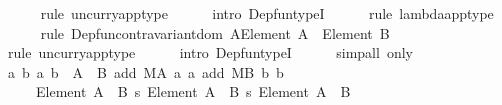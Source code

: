 \begin{isabellebody}
\ \ \ \ \isamarkupfalse%
\ {\isacharparenleft}{\kern0pt}rule\ uncurry{\isacharunderscore}{\kern0pt}app{\isacharunderscore}{\kern0pt}type{\isacharparenright}{\kern0pt}\isanewline
\ \ \ \ \isamarkupfalse%
\ {\isacharparenleft}{\kern0pt}intro\ Dep{\isacharunderscore}{\kern0pt}fun{\isacharunderscore}{\kern0pt}typeI{\isacharparenright}{\kern0pt}\isanewline
\ \ \ \ \isamarkupfalse%
\ {\isacharparenleft}{\kern0pt}rule\ lambda{\isacharunderscore}{\kern0pt}app{\isacharunderscore}{\kern0pt}type{\isacharparenright}{\kern0pt}\isanewline
\ \ \ \ \isamarkupfalse%
\ {\isacharparenleft}{\kern0pt}rule\ Dep{\isacharunderscore}{\kern0pt}fun{\isacharunderscore}{\kern0pt}contravariant{\isacharunderscore}{\kern0pt}dom{\isacharbrackleft}{\kern0pt}\ {\isacharquery}{\kern0pt}A{\isacharequal}{\kern0pt}{\isachardoublequoteopen}Element\ A\ {\isasymtimes}\ Element\ B{\isachardoublequoteclose}{\isacharbrackright}{\kern0pt}{\isacharparenright}{\kern0pt}\isanewline
\ \ \ \ \isamarkupfalse%
\ {\isacharparenleft}{\kern0pt}rule\ uncurry{\isacharunderscore}{\kern0pt}app{\isacharunderscore}{\kern0pt}type{\isacharparenright}{\kern0pt}\isanewline
\ \ \ \ \isamarkupfalse%
\ {\isacharparenleft}{\kern0pt}intro\ Dep{\isacharunderscore}{\kern0pt}fun{\isacharunderscore}{\kern0pt}typeI{\isacharparenright}{\kern0pt}\isanewline
\ \ \ \ \isamarkupfalse%
\ {\isacharparenleft}{\kern0pt}simp{\isacharunderscore}{\kern0pt}all\ only{\isacharcolon}{\kern0pt}\ {}{\isacharparenright}{\kern0pt}\isanewline
\ \ \ \ \isamarkupfalse%
\isanewline
\ \ \isamarkupfalse%
\ \isamarkupfalse%
\ {\isachardoublequoteopen}{\isasymlambda}{\isasymlangle}a{}{\isacharcomma}{\kern0pt}\ b{}{\isasymrangle}\ {\isasymlangle}a{}{\isacharcomma}{\kern0pt}\ b{}{\isasymrangle}\ {\isasymin}\ A\ {\isasymtimes}\ B{\isachardot}{\kern0pt}\ {\isasymlangle}add\ MA\ a{}\ a{}{\isacharcomma}{\kern0pt}\ add\ MB\ b{}\ b{}{\isasymrangle}\isanewline
\ \ \ \ {\isacharcolon}{\kern0pt}\ Element\ {\isacharparenleft}{\kern0pt}A\ {\isasymtimes}\ B{\isacharparenright}{\kern0pt}\ {\isasymrightarrow}s\ Element\ {\isacharparenleft}{\kern0pt}A\ {\isasymtimes}\ B{\isacharparenright}{\kern0pt}\ {\isasymrightarrow}s\ Element\ {\isacharparenleft}{\kern0pt}A\ {\isasymtimes}\ B{\isacharparenright}{\kern0pt}{\isachardoublequoteclose}\isanewline
\ \ \ \ \isamarkupfalse%

\end{isabellebody}
